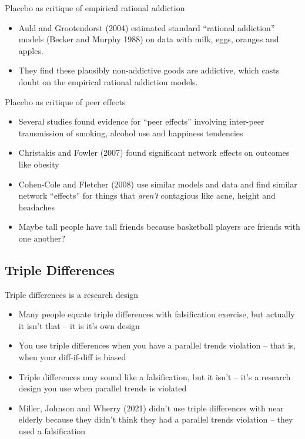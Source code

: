 \documentclass{beamer}
\begin{document}
\begin{frame}{Placebo as critique of empirical rational addiction}

\begin{itemize}
	\item Auld and Grootendorst (2004) estimated standard ``rational addiction'' models (Becker and Murphy 1988) on data with milk, eggs, oranges and apples.
	\item They find these plausibly non-addictive goods are addictive, which casts doubt on the empirical rational addiction models.
\end{itemize}

\end{frame}

\begin{frame}{Placebo as critique of peer effects}

\begin{itemize}
	\item Several studies found evidence for ``peer effects'' involving inter-peer transmission of smoking, alcohol use and happiness tendencies
	\item Christakis and Fowler (2007) found significant network effects on outcomes like obesity
	\item Cohen-Cole and Fletcher (2008) use similar models and data and find similar network ``effects'' for things that \emph{aren't} contagious like acne, height and headaches
	\item Maybe tall people have tall friends because basketball players are friends with one another?
\end{itemize}

\end{frame}



\subsection{Triple Differences}

\begin{frame}{Triple differences is a research design}

\begin{itemize}

\item Many people equate triple differences with falsification exercise, but actually it isn't that -- it is it's own design
\item You use triple differences when you have a parallel trends violation -- that is, when your diff-if-diff is biased
\item Triple differences may sound like a falsification, but it isn't -- it's a research design you use when parallel trends is violated
\item Miller, Johnson and Wherry (2021) didn't use triple differences with near elderly because they didn't think they had a parallel trends violation -- they used a falsification
\end{itemize}

\end{frame}
\end{document}
